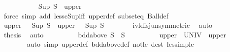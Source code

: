 \begin{isabellebody}
\ \ \ \ \isamarkupfalse%
\ \isamarkupfalse%
\ {\isacharasterisk}{\kern0pt}\ \isamarkupfalse%
\ {\isachardoublequoteopen}{\isacharbraceleft}{\kern0pt}{\isachardot}{\kern0pt}{\isachardot}{\kern0pt}{\isacharless}{\kern0pt}\ Sup\ S{\isacharbraceright}{\kern0pt}\ {\isasymsubseteq}\ upper{\isachardoublequoteclose}\isanewline
\ \ \ \ \ \ \isamarkupfalse%
\ {\isacharparenleft}{\kern0pt}force\ simp\ add{\isacharcolon}{\kern0pt}\ less{\isacharunderscore}{\kern0pt}cSup{\isacharunderscore}{\kern0pt}iff\ upper{\isacharunderscore}{\kern0pt}def\ subset{\isacharunderscore}{\kern0pt}eq\ Ball{\isacharunderscore}{\kern0pt}def{\isacharparenright}{\kern0pt}\isanewline
\ \ \ \ \isamarkupfalse%
\ \isamarkupfalse%
\ {\isachardoublequoteopen}upper\ {\isacharequal}{\kern0pt}\ {\isacharbraceleft}{\kern0pt}{\isachardot}{\kern0pt}{\isachardot}{\kern0pt}\ Sup\ S{\isacharbraceright}{\kern0pt}\ {\isasymor}\ upper\ {\isacharequal}{\kern0pt}\ {\isacharbraceleft}{\kern0pt}{\isachardot}{\kern0pt}{\isachardot}{\kern0pt}{\isacharless}{\kern0pt}\ Sup\ S{\isacharbraceright}{\kern0pt}{\isachardoublequoteclose}\isanewline
\ \ \ \ \ \ \isamarkupfalse%
\ ivl{\isacharunderscore}{\kern0pt}disj{\isacharunderscore}{\kern0pt}un{\isacharparenleft}{\kern0pt}{}{\isacharparenright}{\kern0pt}{\isacharbrackleft}{\kern0pt}symmetric{\isacharbrackright}{\kern0pt}\ \isamarkupfalse%
\ auto\isanewline
\ \ \ \ \isamarkupfalse%
\ \isamarkupfalse%
\ {\isacharquery}{\kern0pt}thesis\ \isamarkupfalse%
\ auto\isanewline
\ \ \isamarkupfalse%
\isanewline
\ \ \ \ \isamarkupfalse%
\ {\isachardoublequoteopen}{\isasymnot}\ {\isacharparenleft}{\kern0pt}bdd{\isacharunderscore}{\kern0pt}above\ S\ {\isasymand}\ S\ {\isasymnoteq}\ {\isacharbraceleft}{\kern0pt}{\isacharbraceright}{\kern0pt}{\isacharparenright}{\kern0pt}{\isachardoublequoteclose}\isanewline
\ \ \ \ \isamarkupfalse%
\ \isamarkupfalse%
\ {\isachardoublequoteopen}upper\ {\isacharequal}{\kern0pt}\ UNIV\ {\isasymor}\ upper\ {\isacharequal}{\kern0pt}\ {\isacharbraceleft}{\kern0pt}{\isacharbraceright}{\kern0pt}{\isachardoublequoteclose}\isanewline
\ \ \ \ \ \ \isamarkupfalse%
\ {\isacharparenleft}{\kern0pt}auto\ simp{\isacharcolon}{\kern0pt}\ upper{\isacharunderscore}{\kern0pt}def\ bdd{\isacharunderscore}{\kern0pt}above{\isacharunderscore}{\kern0pt}def\ not{\isacharunderscore}{\kern0pt}le\ dest{\isacharcolon}{\kern0pt}\ less{\isacharunderscore}{\kern0pt}imp{\isacharunderscore}{\kern0pt}le{\isacharparenright}{\kern0pt}\isanewline

\end{isabellebody}
